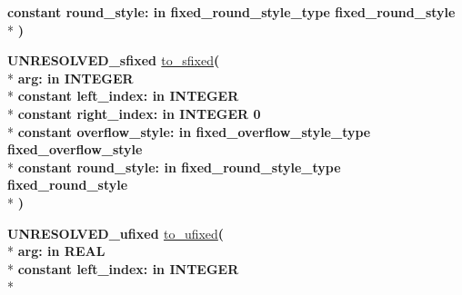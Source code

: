 \begin{DoxyCompactItemize}
{\bfseries {\bfseries \textcolor{keywordflow}{constant}\textcolor{vhdlchar}{ }}\textcolor{vhdlchar}{round\+\_\+style\+: }\textcolor{stringliteral}{in }\textcolor{vhdlchar}{fixed\+\_\+round\+\_\+style\+\_\+type     fixed\+\_\+round\+\_\+style}}\\*
{\bfseries  )} 
\item 
{\bfseries {\bfseries \textcolor{vhdlchar}{U\+N\+R\+E\+S\+O\+L\+V\+E\+D\+\_\+sfixed}\textcolor{vhdlchar}{ }}} \hyperlink{class__fixed__pkg_a440e389275888b28c0eff1c60223a3d0}{to\+\_\+sfixed}{\bfseries  ( }\\*
{\bfseries \textcolor{vhdlchar}{arg\+: }\textcolor{stringliteral}{in }{\bfseries \textcolor{comment}{I\+N\+T\+E\+G\+E\+R}\textcolor{vhdlchar}{ }}}\\*
{\bfseries {\bfseries \textcolor{keywordflow}{constant}\textcolor{vhdlchar}{ }}\textcolor{vhdlchar}{left\+\_\+index\+: }\textcolor{stringliteral}{in }{\bfseries \textcolor{comment}{I\+N\+T\+E\+G\+E\+R}\textcolor{vhdlchar}{ }}}\\*
{\bfseries {\bfseries \textcolor{keywordflow}{constant}\textcolor{vhdlchar}{ }}\textcolor{vhdlchar}{right\+\_\+index\+: }\textcolor{stringliteral}{in }\textcolor{vhdlchar}{I\+N\+T\+E\+G\+E\+R   0}}\\*
{\bfseries {\bfseries \textcolor{keywordflow}{constant}\textcolor{vhdlchar}{ }}\textcolor{vhdlchar}{overflow\+\_\+style\+: }\textcolor{stringliteral}{in }\textcolor{vhdlchar}{fixed\+\_\+overflow\+\_\+style\+\_\+type     fixed\+\_\+overflow\+\_\+style}}\\*
{\bfseries {\bfseries \textcolor{keywordflow}{constant}\textcolor{vhdlchar}{ }}\textcolor{vhdlchar}{round\+\_\+style\+: }\textcolor{stringliteral}{in }\textcolor{vhdlchar}{fixed\+\_\+round\+\_\+style\+\_\+type     fixed\+\_\+round\+\_\+style}}\\*
{\bfseries  )} 
\item 
{\bfseries {\bfseries \textcolor{vhdlchar}{U\+N\+R\+E\+S\+O\+L\+V\+E\+D\+\_\+ufixed}\textcolor{vhdlchar}{ }}} \hyperlink{class__fixed__pkg_add558c42f9de17fdcbe3150c6f82ab99}{to\+\_\+ufixed}{\bfseries  ( }\\*
{\bfseries \textcolor{vhdlchar}{arg\+: }\textcolor{stringliteral}{in }{\bfseries \textcolor{comment}{R\+E\+A\+L}\textcolor{vhdlchar}{ }}}\\*
{\bfseries {\bfseries \textcolor{keywordflow}{constant}\textcolor{vhdlchar}{ }}\textcolor{vhdlchar}{left\+\_\+index\+: }\textcolor{stringliteral}{in }{\bfseries \textcolor{comment}{I\+N\+T\+E\+G\+E\+R}\textcolor{vhdlchar}{ }}}\\*

\end{DoxyCompactItemize}

